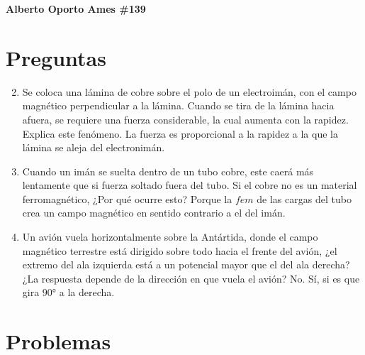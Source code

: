 \documentclass[10pt, twoside]{article}
\begin{document}
\thispagestyle{fancy}

\textbf{Alberto Oporto Ames \#139}

\section{Preguntas}%
\label{sec:preguntas}

\begin{enumerate}
	\setcounter{enumi}{1}
	\item Se coloca una lámina de cobre sobre el polo de un electroimán,
		con el campo magnético perpendicular a la lámina.
		Cuando se tira de la lámina hacia afuera,
		se requiere una fuerza considerable,
		la cual aumenta con la rapidez.
		Explica este fenómeno.
		\subitem La fuerza es proporcional a la rapidez a la que la lámina
			se aleja del electronimán.
	\setcounter{enumi}{3}
	\item Cuando un imán se suelta dentro de un tubo cobre,
		este caerá más lentamente que si fuerza soltado fuera del tubo.
		Si el cobre no es un material ferromagnético,
		¿Por qué ocurre esto?
		\subitem Porque la $fem$ de las cargas del tubo crea un
			campo magnético en sentido contrario a el del imán.
	\item Un avión vuela horizontalmente sobre la Antártida,
		donde el campo magnético terrestre está dirigido sobre todo hacia el
		frente del avión,
		¿el extremo del ala izquierda está a un potencial mayor que el del ala
		derecha?
		¿La respuesta depende de la dirección en que vuela el avión?
		\subitem No.
		\subitem Sí, si es que gira $90°$ a la derecha.
\end{enumerate}

\section{Problemas}%
\label{sec:problemas}
\end{document}
